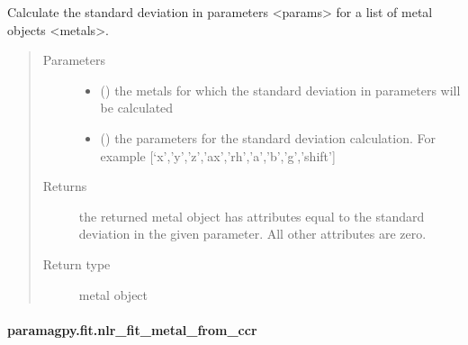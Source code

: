 \documentclass[a4paper,10pt,english,openany,oneside]{sphinxmanual}
\begin{document}
\begin{fulllineitems}
\label{\detokenize{reference/generated/paramagpy.fit.metal_standard_deviation:paramagpy.fit.metal_standard_deviation}}
Calculate the standard deviation in parameters \textless{}params\textgreater{} for a
list of metal objects \textless{}metals\textgreater{}.
\begin{quote}\begin{description}
\item[{Parameters}] \leavevmode\begin{itemize}
\item {} 
 () \textendash{} the metals for which the standard deviation in parameters
will be calculated

\item {} 
 () \textendash{} the parameters for the standard deviation calculation.
For example {[}‘x’,’y’,’z’,’ax’,’rh’,’a’,’b’,’g’,’shift’{]}

\end{itemize}

\item[{Returns}] \leavevmode
{} \textendash{} the returned metal object has attributes equal to the
standard deviation in the given parameter.
All other attributes are zero.

\item[{Return type}] \leavevmode
metal object

\end{description}\end{quote}

\end{fulllineitems}



\paragraph{paramagpy.fit.nlr\_fit\_metal\_from\_ccr}
\label{\detokenize{reference/generated/paramagpy.fit.nlr_fit_metal_from_ccr:paramagpy-fit-nlr-fit-metal-from-ccr}}\label{\detokenize{reference/generated/paramagpy.fit.nlr_fit_metal_from_ccr::doc}}
\end{document}
